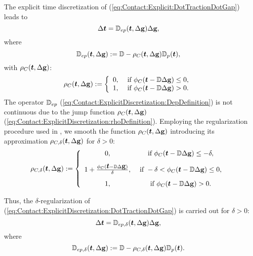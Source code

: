 \documentclass[12pt,a4paper]{scrbook}
\begin{document}
The explicit time discretization of (\ref{eq:Contact:Explicit:DotTractionDotGap}) leads to 
\begin{equation}\label{eq:Contact:ExplicitDiscretization:DotTractionDotGap}
 \Delta \mbox{\boldmath$t$}={\mathbb D}_{ep}(\mbox{\boldmath$t$},\Delta \mbox{\boldmath$\mathrm{g}$})\Delta \mbox{\boldmath$\mathrm{g}$},
\end{equation}
where 
\begin{equation}\label{eq:Contact:ExplicitDiscretization:DepDefinition}
{\mathbb D}_{ep}(\mbox{\boldmath$t$},\Delta \mbox{\boldmath$\mathrm{g}$}):={\mathbb D}-\rho_{C}(\mbox{\boldmath$t$},\Delta \mbox{\boldmath$\mathrm{g}$}){\mathbb D}_{p}(\mbox{\boldmath$t$}),
\end{equation}
with $\rho_{C}(\mbox{\boldmath$t$},\Delta \mbox{\boldmath$\mathrm{g}$})$:
\begin{equation}\label{eq:Contact:ExplicitDiscretization:rhoDefinition}
\rho_{C}(\mbox{\boldmath$t$},\Delta \mbox{\boldmath$\mathrm{g}$}):=\left\lbrace \begin{array}{cc} 0,& \mbox{ if } \phi_{C}(\mbox{\boldmath$t$}-{\mathbb D} \Delta \mbox{\boldmath$\mathrm{g}$})\leq 0,\\ 1, &\mbox{ if } \phi_{C}(\mbox{\boldmath$t$}-{\mathbb D} \Delta \mbox{\boldmath$\mathrm{g}$})>0.\end{array}\right.
\end{equation}
The operator ${\mathbb D}_{ep}$ (\ref{eq:Contact:ExplicitDiscretization:DepDefinition}) is not continuous due to the jump function $\rho_{C}(\mbox{\boldmath$t$},\Delta \mbox{\boldmath$\mathrm{g}$})$ (\ref{eq:Contact:ExplicitDiscretization:rhoDefinition}). Employing the regularization procedure used in \cite{KoLa84,BlAx97}, we smooth the function $\rho_{C}(\mbox{\boldmath$t$},\Delta \mbox{\boldmath$\mathrm{g}$})$ introducing its approximation $\rho_{C,\delta}(\mbox{\boldmath$t$},\Delta \mbox{\boldmath$\mathrm{g}$})$ for $\delta>0$:
\begin{equation}\label{eq:Contact:ExplicitDiscretization:rhoDeltaDefinition}
\rho_{C,\delta}(\mbox{\boldmath$t$},\Delta \mbox{\boldmath$\mathrm{g}$}):=\left\lbrace \begin{array}{cc} 0,& \mbox{ if } \phi_{C}(\mbox{\boldmath$t$}-{\mathbb D} \Delta \mbox{\boldmath$\mathrm{g}$})\leq -\delta,\\[2ex] 1+\frac{\phi_{C}(\mbox{\boldmath$t$}-{\mathbb D} \Delta \mbox{\boldmath$\mathrm{g}$})}{\delta},& \mbox{ if } -\delta < \phi_{C}(\mbox{\boldmath$t$}-{\mathbb D} \Delta \mbox{\boldmath$\mathrm{g}$})\leq 0, \\[2ex] 1, &\mbox{ if } \phi_{C}(\mbox{\boldmath$t$}-{\mathbb D} \Delta \mbox{\boldmath$\mathrm{g}$})>0.\end{array}\right.
\end{equation}


Thus, the $\delta$-regularization of (\ref{eq:Contact:ExplicitDiscretization:DotTractionDotGap}) is carried out for $\delta>0$:
\begin{equation}\label{eq:Contact:ExplicitDiscretization:DotTractionDotGapRegularized}
 \Delta \mbox{\boldmath$t$}={\mathbb D}_{ep,\delta}(\mbox{\boldmath$t$},\Delta \mbox{\boldmath$\mathrm{g}$})\Delta \mbox{\boldmath$\mathrm{g}$},
\end{equation}
where
\begin{equation}\label{eq:Contact:ExplicitDiscretization:DepDefinitionRegularized}
{\mathbb D}_{ep,\delta}(\mbox{\boldmath$t$},\Delta \mbox{\boldmath$\mathrm{g}$}):={\mathbb D}-\rho_{C,\delta}(\mbox{\boldmath$t$},\Delta \mbox{\boldmath$\mathrm{g}$}){\mathbb D}_{p}(\mbox{\boldmath$t$}).
\end{equation}
\end{document}
